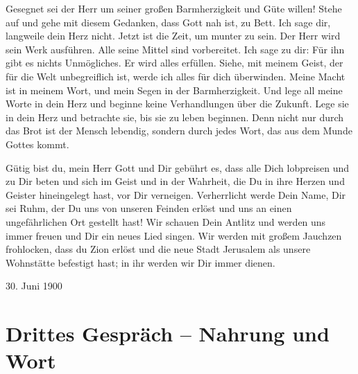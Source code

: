 Gesegnet sei der Herr um seiner großen Barmherzigkeit und Güte willen! Stehe auf und gehe mit diesem Gedanken, dass Gott nah ist, zu Bett. Ich sage dir, langweile dein Herz nicht. Jetzt ist die Zeit, um munter zu sein. Der Herr wird sein Werk ausführen. Alle seine Mittel sind vorbereitet. Ich sage zu dir: Für ihn gibt es nichts Unmögliches. Er wird alles erfüllen. Siehe, mit meinem Geist, der für die Welt unbegreiflich ist, werde ich alles für dich überwinden. Meine Macht ist in meinem Wort, und mein Segen in der Barmherzigkeit. Und lege all meine Worte in dein Herz und beginne keine Verhandlungen über die Zukunft. Lege sie in dein Herz und betrachte sie, bis sie zu leben beginnen. Denn nicht nur durch das Brot ist der Mensch lebendig, sondern durch jedes Wort, das aus dem Munde Gottes kommt.

Gütig bist du, mein Herr Gott und Dir gebührt es, dass alle Dich lobpreisen und zu Dir beten und sich im Geist und in der Wahrheit, die Du in ihre Herzen und Geister hineingelegt hast, vor Dir verneigen. Verherrlicht werde Dein Name, Dir sei Ruhm, der Du uns von unseren Feinden erlöst und uns an einen ungefährlichen Ort gestellt hast! Wir schauen Dein Antlitz und werden uns immer freuen und Dir ein neues Lied singen. Wir werden mit großem Jauchzen frohlocken, dass du Zion erlöst und die neue Stadt Jerusalem als unsere Wohnstätte befestigt hast; in ihr werden wir Dir immer dienen.



30. Juni 1900




\section{Drittes Gespräch -- Nahrung und Wort}

